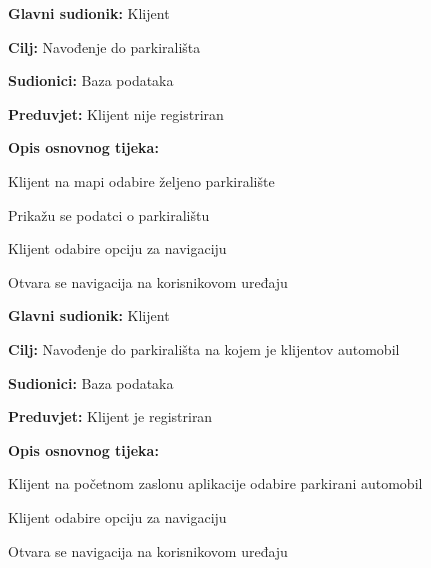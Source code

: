 \noindent {}
\begin{packed_item}
	
	\item \textbf{Glavni sudionik:} Klijent
	\item  \textbf{Cilj:} Navođenje do parkirališta
	\item  \textbf{Sudionici:} Baza podataka
	\item  \textbf{Preduvjet:} Klijent nije registriran
	\item  \textbf{Opis osnovnog tijeka:}
	
	\item[] \begin{packed_enum}
		
		\item Klijent na mapi odabire željeno parkiralište
		\item Prikažu se podatci o parkiralištu
		\item Klijent odabire opciju za navigaciju
		\item Otvara se navigacija na korisnikovom uređaju
		
	\end{packed_enum}
\end{packed_item}

\noindent {}
\begin{packed_item}
	
	\item \textbf{Glavni sudionik:} Klijent
	\item  \textbf{Cilj:} Navođenje do parkirališta na kojem je klijentov automobil
	\item  \textbf{Sudionici:} Baza podataka
	\item  \textbf{Preduvjet:} Klijent je registriran
	\item  \textbf{Opis osnovnog tijeka:}
	
	\item[] \begin{packed_enum}
		
		\item Klijent na početnom zaslonu aplikacije odabire parkirani automobil
		\item Klijent odabire opciju za navigaciju
		\item Otvara se navigacija na korisnikovom uređaju
		
	\end{packed_enum}
\end{packed_item}
